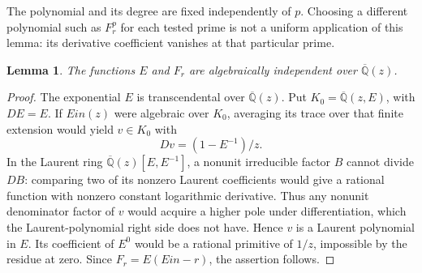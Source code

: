 \documentclass[11pt,a4paper]{article}
\newtheorem{lemma}[theorem]{Lemma}
\theoremstyle{definition}
\theoremstyle{remark}
\theoremstyle{plain}
\numberwithin{equation}{section}
\def\operatorname#1{#1}\def\mathrm#1{#1}}
\begin{document}
The polynomial and its degree are fixed independently of $p$.
Choosing a different polynomial such as $F_r^p$ for each tested prime
is not a uniform application of this lemma: its derivative coefficient
vanishes at that particular prime.

\begin{lemma}\label{sc:nl:independence}
The functions $E$ and $F_r$ are algebraically independent over
$\overline{\mathbb Q}(z)$.
\end{lemma}
\begin{proof}
The exponential $E$ is transcendental over $\overline{\mathbb Q}(z)$.
Put $K_0=\overline{\mathbb Q}(z,E)$, with $DE=E$.
If $\operatorname{Ein}(z)$ were algebraic over $K_0$, averaging its
trace over that finite extension would yield $v\in K_0$ with
\[
 Dv=(1-E^{-1})/z.
\]
In the Laurent ring $\overline{\mathbb Q}(z)[E,E^{-1}]$, a nonunit
irreducible factor $B$ cannot divide $DB$: comparing two of its
nonzero Laurent coefficients would give a rational function with
nonzero constant logarithmic derivative. Thus any nonunit denominator
factor of $v$ would acquire a higher pole under differentiation, which
the Laurent-polynomial right side does not have. Hence $v$ is a Laurent
polynomial in $E$. Its coefficient of $E^0$ would be a rational
primitive of $1/z$, impossible by the residue at zero.
Since $F_r=E(\operatorname{Ein}-r)$, the assertion follows.
\end{proof}
\end{document}
